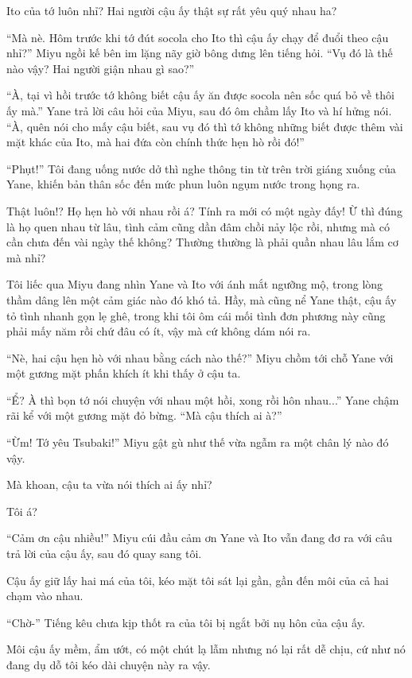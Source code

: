 {Ito của tớ luôn nhỉ? Hai người cậu ấy thật sự rất yêu quý nhau ha?

``Mà nè. Hôm trước khi tớ đút socola cho Ito thì cậu ấy chạy để đuổi
theo cậu nhỉ?'' Miyu ngồi kế bên im lặng nãy giờ bông dưng lên tiếng
hỏi. ``Vụ đó là thế nào vậy? Hai người giận nhau gì sao?''

``À, tại vì hồi trước tớ không biết cậu ấy ăn được socola nên sốc quá bỏ
về thôi ấy mà.'' Yane trả lời câu hỏi của Miyu, sau đó ôm chầm lấy Ito
và hí hửng nói. ``À, quên nói cho mấy cậu biết, sau vụ đó thì tớ không
những biết được thêm vài mặt khác của Ito, mà hai đứa còn chính thức hẹn
hò rồi đó!''

``Phụt!'' Tôi đang uống nước dở thì nghe thông tin từ trên trời giáng
xuống của Yane, khiến bản thân sốc đến mức phun luôn ngụm nước trong
họng ra.

Thật luôn!? Họ hẹn hò với nhau rồi á? Tính ra mới có một ngày đấy! Ừ thì
đúng là họ quen nhau từ lâu, tình cảm cũng dần đâm chồi nảy lộc rồi,
nhưng mà có cần chưa đến vài ngày thế không? Thường thường là phải quần
nhau lâu lắm cơ mà nhỉ?

Tôi liếc qua Miyu đang nhìn Yane và Ito với ánh mắt ngưỡng mộ, trong
lòng thầm dâng lên một cảm giác nào đó khó tả. Hầy, mà cũng nể Yane
thật, cậu ấy tỏ tình nhanh gọn lẹ ghê, trong khi tôi ôm cái mối tình đơn
phương này cũng phải mấy năm rồi chứ đâu có ít, vậy mà cứ không dám nói
ra.

``Nè, hai cậu hẹn hò với nhau bằng cách nào thế?'' Miyu chồm tới chỗ
Yane với một gương mặt phấn khích ít khi thấy ở cậu ta.

``Ể? À thì bọn tớ nói chuyện với nhau một hồi, xong rồi hôn nhau...''
Yane chậm rãi kể với một gương mặt đỏ bừng. ``Mà cậu thích ai à?''

``Ừm! Tớ yêu Tsubaki!'' Miyu gật gù như thế vừa ngẫm ra một chân lý nào
đó vậy.

Mà khoan, cậu ta vừa nói thích ai ấy nhỉ?

Tôi á?

``Cảm ơn cậu nhiều!'' Miyu cúi đầu cảm ơn Yane và Ito vẫn đang đơ ra với
câu trả lời của cậu ấy, sau đó quay sang tôi.

Cậu ấy giữ lấy hai má của tôi, kéo mặt tôi sát lại gần, gần đến môi của
cả hai chạm vào nhau.

``Chờ-'' Tiếng kêu chưa kịp thốt ra của tôi bị ngắt bởi nụ hôn của cậu
ấy.

Môi cậu ấy mềm, ẩm ướt, có một chút lạ lẫm nhưng nó lại rất dễ chịu, cứ
như nó đang dụ dỗ tôi kéo dài chuyện này ra vậy.

}
